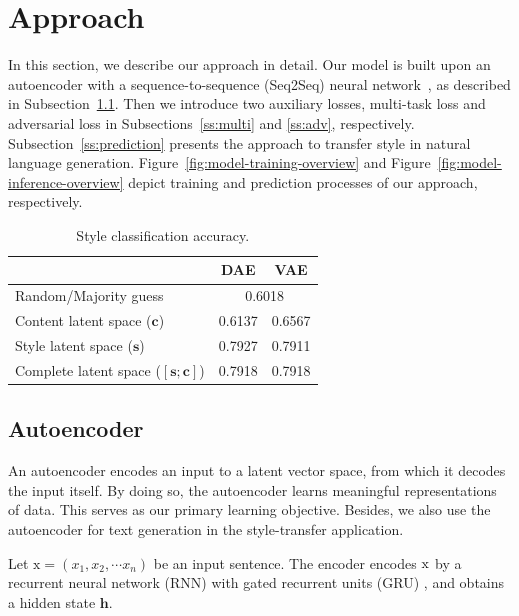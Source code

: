 \documentclass[11pt,a4paper]{article}
\newcommand{\rmx}{\mathrm x}
\newcommand{\tabh}[1]{\multicolumn{1}{c|}{\textbf{#1}}}
\begin{document}
\section{Approach}

In this section, we describe our approach in detail. Our model is built upon an autoencoder with a sequence-to-sequence (Seq2Seq) neural network~\cite{sutskever2014sequence}, as described in Subsection~\ref{ss:seq2seq}. Then we introduce two auxiliary losses, multi-task loss and adversarial loss in Subsections~\ref{ss:multi} and \ref{ss:adv}, respectively. Subsection~\ref{ss:prediction} presents the approach to transfer style in natural language generation. Figure~\ref{fig:model-training-overview} and Figure~\ref{fig:model-inference-overview} depict training and prediction processes of our approach, respectively.

\begin{table}[ht]
	\centering
	\begin{tabular}{| l | r | r |}
		\hline
		                                        & \tabh{DAE}                  & \tabh{VAE} \\
		\hline \hline
		Random/Majority guess                   & \multicolumn{2}{c|}{0.6018}              \\ \hline \hline
		Content latent space  ($\bm c$)         & 0.6137                      & 0.6567     \\ \hline
		Style latent space ($\bm s$)            & 0.7927                      & 0.7911     \\ \hline
		Complete latent space ($[\bm s;\bm c]$) & 0.7918                      & 0.7918     \\
		\hline
	\end{tabular}
	\caption{Style classification accuracy.}
	\label{tab:classification}
\end{table}


\subsection{Autoencoder} \label{ss:seq2seq}

An autoencoder encodes an input to a latent vector space, from which it decodes the input itself. By doing so, the autoencoder learns meaningful representations of data. This serves as our primary learning objective. Besides, we also use the autoencoder for text generation in the style-transfer application.

Let $\rmx=(x_1, x_2, \cdots x_n)$ be an input sentence. The encoder encodes $\rm x$ by a recurrent neural network (RNN) with gated recurrent units (GRU) \cite{cho2014learning}, and obtains a hidden state $\bm h$.
\end{document}

